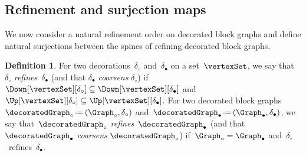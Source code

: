 \documentclass{amsart}
\theoremstyle{definition}
\newtheorem{definition}[theorem]{Definition}
\newcommand{\eqdef}{\mbox{\,\raisebox{0.2ex}{\scriptsize\ensuremath{\mathrm:}}\ensuremath{=}\,}} %
\newcommand{\darkblue}{\color{darkblue}} %
\newcommand{\defn}[1]{\textsl{\darkblue #1}} %
\newcommand{\decoration}{\delta}
\begin{document}


\subsection{Refinement and surjection maps}
\label{subsec:surjectionMaps}

We now consider a natural refinement order on decorated block graphs and define natural surjections between the spines of refining decorated block graphs.

\begin{definition}
  \label{def:refinementDecoratedGraphs}
  For two decorations~$\decoration_\circ$ and~$\decoration_\bullet$ on a set~$\vertexSet$, we say that~$\decoration_\circ$ \defn{refines}~$\decoration_\bullet$ (and that $\decoration_\bullet$ \defn{coarsens} $\decoration_\circ$) if~$\Down[\vertexSet][\decoration_\circ] \subseteq \Down[\vertexSet][\decoration_\bullet]$ and $\Up[\vertexSet][\decoration_\circ] \subseteq \Up[\vertexSet][\decoration_\bullet]$.
  For two decorated block graphs~$\decoratedGraph_\circ \eqdef (\Graph_\circ, \decoration_\circ)$ and~$\decoratedGraph_\bullet \eqdef (\Graph_\bullet, \decoration_\bullet)$, we say that~$\decoratedGraph_\circ$ \defn{refines}~$\decoratedGraph_\bullet$ (and that $\decoratedGraph_\bullet$ \defn{coarsens} $\decoratedGraph_\circ$) if~$\Graph_\circ = \Graph_\bullet$ and~$\decoration_\circ$~refines~$\decoration_\bullet$.
\end{definition}
\end{document}
